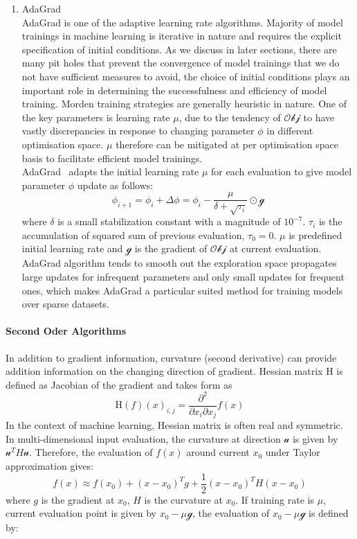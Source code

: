 \begin{enumerate}
    \item AdaGrad \\
AdaGrad is one of the adaptive learning rate algorithms. Majority of model trainings in machine learning is iterative in nature and requires the explicit specification of initial conditions. As we discuss in later sections, there are many pit holes that prevent the convergence of model trainings that we do not have sufficient measures to avoid, the choice of initial conditions plays an important role in determining the successfulness and efficiency of model training. Morden training strategies are generally heuristic in nature. One of the key parameters is learning rate $\mu$, due to the tendency of $\mathcal{Obj}$ to have vastly discrepancies in response to changing parameter $\phi$ in different optimisation space. $\mu$ therefore can be mitigated at per optimisation space basis to facilitate efficient model trainings. \\
AdaGrad~\cite{Duchi:2011} adapts the initial learning rate $\mu$ for each evaluation to give model parameter $\phi$ update as follows:
\begin{equation}
    \phi_{i+1} = \phi_{i} + \Delta \phi = \phi_i - \frac{\mu}{\delta + \sqrt{\tau_i}} \odot \mathcal{g}
\end{equation}
where $\delta$ is a small stabilization constant with a magnitude of $10^{-7}$. $\tau_i$ is the accumulation of squared sum of previous evaluation, $\tau_0 = 0$. $\mu$ is predefined initial learning rate and $\mathcal{g}$ is the gradient of $\mathcal{Obj}$ at current evaluation. \\ 
AdaGrad algorithm tends to smooth out the exploration space propagates large updates for infrequent parameters and only small updates for frequent ones, which makes AdaGrad a particular suited method for training models over sparse datasets. 
\end{enumerate}

\paragraph{Second Oder Algorithms}
In addition to gradient information, curvature (second derivative) can provide addition information on the changing direction of gradient. Hessian matrix $\mathrm{H}$ is defined as Jacobian of the gradient and takes form as 
\begin{equation}
    \mathrm{H}(f)(x)_{i,j} = \frac{\partial^2}{\partial x_i \partial x_j}f(x)
\end{equation}
In the context of machine learning, Hessian matrix is often real and symmetric. In multi-dimensional input evaluation, the curvature at direction $\mathcal{u}$ is given by $\mathcal{u}^TH\mathcal{u}$. Therefore, the evaluation of $f(x)$ around current $x_0$ under Taylor approximation gives:
\begin{equation}
    \label{eq:TaylorEvaluation}
    f(x) \approx f(x_0)+(x-x_0)^Tg+\frac{1}{2}(x-x_0)^TH(x-x_0)
\end{equation}
where $g$ is the gradient at $x_0$, $H$ is the curvature at $x_0$. If training rate is $\mu$, current evaluation point is given by $x_0-\mu\mathcal{g}$, the evaluation of $x_0-\mu\mathcal{g}$ is defined by:

